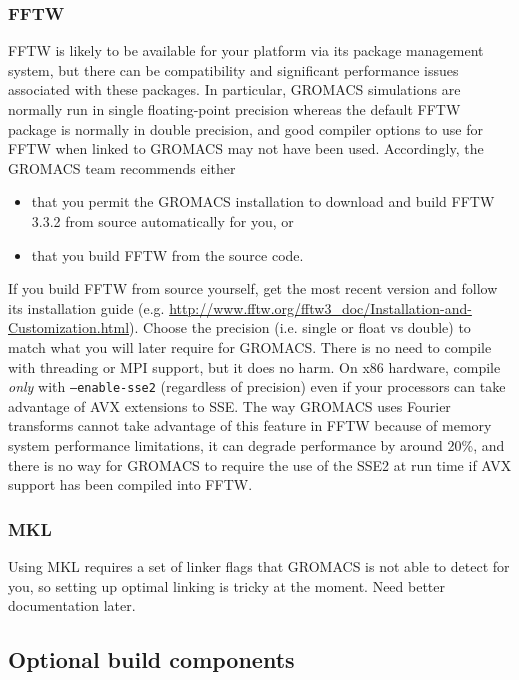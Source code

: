 \documentclass{article}[12pt,a4paper,twoside]
\newcommand{\gromacs}{GROMACS}
\newcommand{\fftw}{FFTW}
\newcommand{\mkl}{MKL}
\newcommand{\mpi}{MPI}
\newcommand{\sse}{SSE}
\newcommand{\ssetwo}{SSE2}
\newcommand{\avx}{AVX}
\newcommand{\fftwversion}{3.3.2}
\begin{document}
\subsubsection{\fftw{}}

\fftw{} is likely to be available for your platform via its package
management system, but there can be compatibility and significant
performance issues associated with these packages. In particular,
\gromacs{} simulations are normally run in single floating-point
precision whereas the default \fftw{} package is normally in double
precision, and good compiler options to use for \fftw{} when linked to
\gromacs{} may not have been used. Accordingly, the \gromacs{} team
recommends either
\begin{itemize}
\item that you permit the \gromacs{} installation to download and
  build \fftw{} \fftwversion{} from source automatically
  for you, or
\item that you build \fftw{} from the source code.
\end{itemize}

If you build \fftw{} from source yourself, get the most recent version
and follow its installation guide
(e.g. \url{http://www.fftw.org/fftw3_doc/Installation-and-Customization.html}). Choose
the precision (i.e. single or float vs double) to match what you will
later require for \gromacs{}. There is no need to compile with
threading or \mpi{} support, but it does no harm. On x86 hardware,
compile \emph{only} with \texttt{--enable-sse2} (regardless of
precision) even if your processors can take advantage of \avx{}
extensions to \sse{}. The way \gromacs{} uses Fourier transforms
cannot take advantage of this feature in \fftw{} because of memory
system performance limitations, it can degrade performance by around
20\%, and there is no way for \gromacs{} to require the use of the
\ssetwo{} at run time if \avx{} support has been compiled into \fftw{}.

\subsubsection{\mkl{}}

Using \mkl{} requires a set of linker flags that \gromacs{} is not
able to detect for you, so setting up optimal linking is tricky at the
moment. Need better documentation later.

\subsection{Optional build components}
\end{document}
